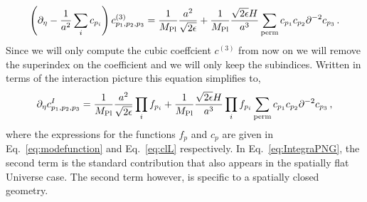 \documentclass[a4paper,11pt]{article}
\numberwithin{equation}{section}
\newcommand{\mpl}{{M_{\mathrm{Pl}}}}
\numberwithin{equation}{section}
\begin{document}
\begin{align}
\left(\partial_\eta-\frac{1}{a^2}\sum_i c_{p_i}\right)c^{(3)}_{p_1,p_2,p_3}=\frac{1}{\mpl}\frac{a^2}{\sqrt{2\epsilon}}+\frac{1}{\mpl}\frac{\sqrt{2\epsilon}H}{a^3}\sum _{\rm{perm}}c_{p_1}c_{p_2}\partial^{-2}c_{p_3} \,.
\end{align}
Since we will only compute the cubic coeffcient $c^{(3)}$ from now on we will remove the superindex on the coefficient and we will only keep the subindices.
Written in terms of the interaction picture this equation simplifies to,
\begin{align}
\partial_{\eta}c^I_{p_1,p_2,p_3}=\frac{1}{\mpl}\frac{a^2}{\sqrt{2\epsilon}}\prod_{i}f_{p_i}+\frac{1}{\mpl}\frac{\sqrt{2\epsilon} H}{a^3}\prod_{i}f_{p_i}\sum _{\rm{perm}}c_{p_1}c_{p_2}\partial^{-2}c_{p_3} \,,
\label{eq:IntegraPNG}
\end{align}
where the expressions for the functions $f_p$ and $c_p$ are given in Eq.~\eqref{eq:modefunction} and Eq.~\eqref{eq:clL} respectively. In Eq.~\eqref{eq:IntegraPNG}, the second term is the standard contribution that also appears in the spatially flat Universe case. The second term however, is specific to a spatially closed geometry.\\
\end{document}
